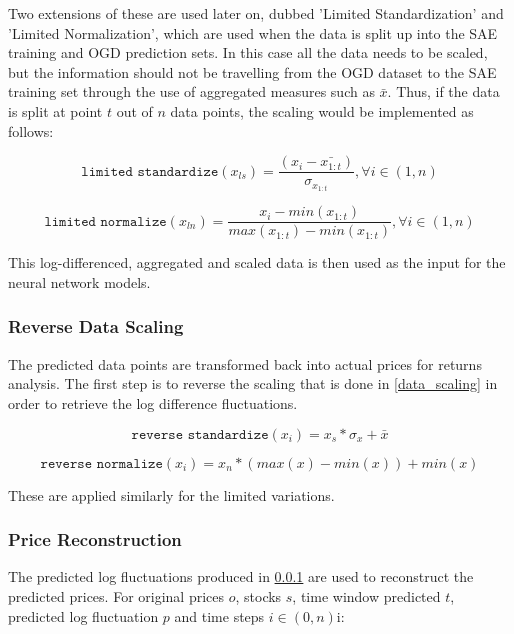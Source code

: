 \documentclass[a4paper,11pt,oneside]{article}
\theoremstyle{plain}
\theoremstyle{definition}
\begin{document}
Two extensions of these are used later on, dubbed 'Limited Standardization' and 'Limited Normalization', which are used when the data is split up into the SAE training and OGD prediction sets. In this case all the data needs to be scaled, but the information should not be travelling from the OGD dataset to the SAE training set through the use of aggregated measures such as $\bar{x}$. Thus, if the data is split at point $t$ out of $n$ data points, the scaling would be implemented as follows:

\begin{equation}
\texttt{limited standardize} (x_{ls}) = \frac{(x_i - \bar{x_{1:t}}) }{\sigma_{x_{1:t}}} , \forall  i \in (1, n)
\end{equation}

\begin{equation}
\texttt{limited normalize} (x_{ln}) = \frac{x_i - min(x_{1:t}) }{max(x_{1:t}) - min(x_{1:t})} , \forall  i \in (1, n)
\end{equation}


This log-differenced, aggregated and scaled data is then used as the input for the neural network models.

\subsubsection{Reverse Data Scaling}\label{data_reverse_scaling}

The predicted data points are transformed back into actual prices for returns analysis. The first step is to reverse the scaling that is done in \ref{data_scaling} in order to retrieve the log difference fluctuations.

\begin{equation}
\texttt{reverse standardize}(x_i) = x_s * \sigma_x + \bar{x}
\end{equation}

\begin{equation}
\texttt{reverse normalize}(x_i) = x_n * (max(x) - min(x)) + min(x)
\end{equation}

These are applied similarly for the limited variations.

\subsubsection{Price Reconstruction}\label{data_price_recon}

The predicted log fluctuations produced in \ref{data_reverse_scaling} are used to reconstruct the predicted prices. For original prices $o$, stocks $s$, time window predicted $t$, predicted log fluctuation $p$ and time steps $i \in (0, n)$i:
\end{document}
